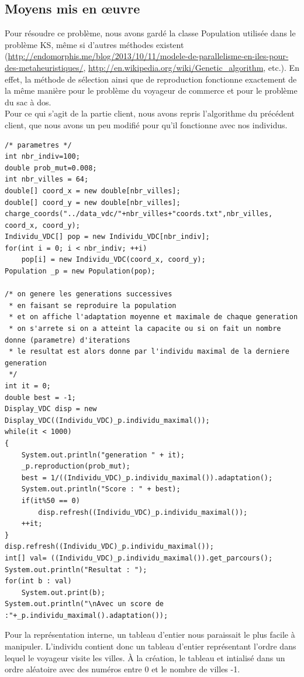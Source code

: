 \documentclass{article}
\begin{document}
\subsection{Moyens mis en \oe uvre}
Pour résoudre ce problème, nous avons gardé la classe Population utilisée dans le problème KS, même si d'autres méthodes existent (\url{http://endomorphis.me/blog/2013/10/11/modele-de-parallelisme-en-iles-pour-des-metaheuristiques/}, \url{http://en.wikipedia.org/wiki/Genetic_algorithm}, etc.). En effet, la méthode de sélection ainsi que de reproduction fonctionne exactement de la même manière pour le problème du voyageur de commerce et pour le problème du sac à dos.\\
Pour ce qui s'agit de la partie client, nous avons repris l'algorithme du précédent client, que nous avons un peu modifié pour qu'il fonctionne avec nos individus.
\begin{verbatim}
/* parametres */ 
int nbr_indiv=100;
double prob_mut=0.008;
int nbr_villes = 64;
double[] coord_x = new double[nbr_villes];
double[] coord_y = new double[nbr_villes];
charge_coords("../data_vdc/"+nbr_villes+"coords.txt",nbr_villes, coord_x, coord_y);
Individu_VDC[] pop = new Individu_VDC[nbr_indiv];
for(int i = 0; i < nbr_indiv; ++i)
	pop[i] = new Individu_VDC(coord_x, coord_y);
Population _p = new Population(pop);

/* on genere les generations successives
 * en faisant se reproduire la population
 * et on affiche l'adaptation moyenne et maximale de chaque generation
 * on s'arrete si on a atteint la capacite ou si on fait un nombre donne (parametre) d'iterations
 * le resultat est alors donne par l'individu maximal de la derniere generation
 */
int it = 0;
double best = -1;
Display_VDC disp = new Display_VDC((Individu_VDC)_p.individu_maximal());
while(it < 1000)
{
	System.out.println("generation " + it);
	_p.reproduction(prob_mut);
	best = 1/((Individu_VDC)_p.individu_maximal()).adaptation();
	System.out.println("Score : " + best);
	if(it%50 == 0)
		disp.refresh((Individu_VDC)_p.individu_maximal());
	++it;
}
disp.refresh((Individu_VDC)_p.individu_maximal());
int[] val= ((Individu_VDC)_p.individu_maximal()).get_parcours();
System.out.println("Resultat : ");
for(int b : val)
	System.out.print(b);
System.out.println("\nAvec un score de :"+_p.individu_maximal().adaptation());
\end{verbatim}
Pour la représentation interne, un tableau d'entier nous paraissait le plus facile à manipuler. L'individu contient donc un tableau d'entier représentant l'ordre dans lequel le voyageur visite les villes. À la création, le tableau et intialisé dans un ordre aléatoire avec des numéros entre 0 et le nombre de villes -1.
\end{document}
